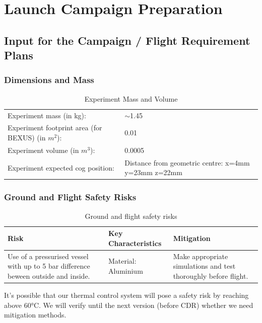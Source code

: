\documentclass[12pt,a4paper]{report}
\begin{document}
\chapter{Launch Campaign Preparation}

\section{Input for the Campaign / Flight Requirement Plans}

\subsection{Dimensions and Mass}

\begin{table}[h]
\centering
\caption{Experiment Mass and Volume}
\label{tab:mass_volume}
\begin{tabular}{L{6cm}L{6cm}}
\toprule
Experiment mass (in kg): & $\sim$1.45\\
Experiment footprint area (for BEXUS) (in $m^2$): & 0.01\\
Experiment volume (in $m^3$): & 0.0005\\
Experiment expected \ac{cog} position: & Distance from geometric centre: x=4mm y=23mm z=22mm \\
\bottomrule
\end{tabular}
\end{table}
\clearpage 

\subsection{Ground and Flight Safety Risks}

\begin{table}[h]
\centering
\caption{Ground and flight safety risks}
\label{tab:safety_risks}
\begin{tabular}{p{4cm} p{5cm} p{4cm}}
\toprule
\textbf{Risk} & \textbf{Key Characteristics} & \textbf{Mitigation} \\
\midrule
Use of a pressurised vessel with up to 5 bar difference beween outside and inside. & Material: Aluminium & Make appropriate simulations and test thoroughly before flight. \\
\bottomrule
\end{tabular}
\end{table}

It's possible that our thermal control system will pose a safety risk by reaching above 60°C. We will verify until the next version (before CDR) whether we need mitigation methods.
\end{document}
